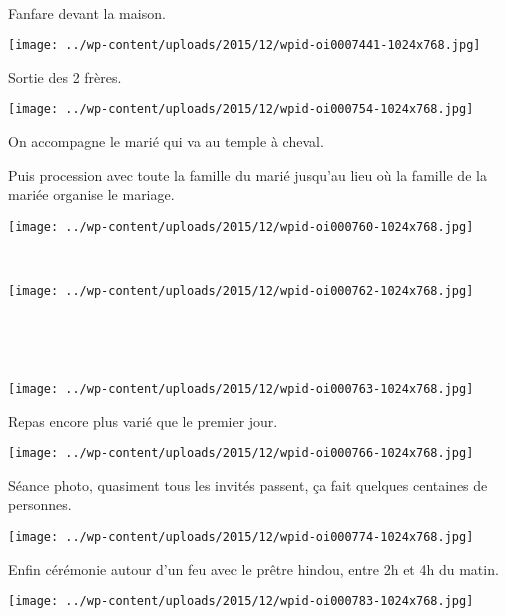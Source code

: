 ~

Fanfare devant la maison.
\begin{center} \texttt{[image: ../wp-content/uploads/2015/12/wpid-oi0007441-1024x768.jpg]} \end{center}
\vspace{-\topsep}
\pagebreak

Sortie des 2 frères.
\begin{center} \texttt{[image: ../wp-content/uploads/2015/12/wpid-oi000754-1024x768.jpg]} \end{center}

On accompagne le marié qui va au temple à cheval.

Puis procession avec toute la famille du marié jusqu'au lieu où la famille de la mariée organise le mariage. 
\begin{center} \texttt{[image: ../wp-content/uploads/2015/12/wpid-oi000760-1024x768.jpg]} \end{center}
\vspace{-\topsep}
\pagebreak

~
\vspace{-0.5mm}
\begin{center} \texttt{[image: ../wp-content/uploads/2015/12/wpid-oi000762-1024x768.jpg]} \end{center}

~

~\\
\begin{center} \texttt{[image: ../wp-content/uploads/2015/12/wpid-oi000763-1024x768.jpg]} \end{center}
\vspace{-\topsep}
\pagebreak

Repas encore plus varié que le premier jour.
\begin{center} \texttt{[image: ../wp-content/uploads/2015/12/wpid-oi000766-1024x768.jpg]} \end{center}

Séance photo, quasiment tous les invités passent, ça fait quelques centaines de personnes. 
\begin{center} \texttt{[image: ../wp-content/uploads/2015/12/wpid-oi000774-1024x768.jpg]} \end{center}
\vspace{-\topsep}
\pagebreak

Enfin cérémonie autour d'un feu avec le prêtre hindou, entre 2h et 4h du matin. 
\vspace{1mm}
\begin{center} \texttt{[image: ../wp-content/uploads/2015/12/wpid-oi000783-1024x768.jpg]} \end{center}
